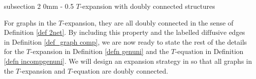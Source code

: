 \documentclass{article}
\makeatletter
\newcommand{\1}{\mathds{1}}
\numberwithin{equation}{section}
\newcommand{\dashed}{\text{diffusive}}
\newcommand{\selfs}{\text{self-energies}}
\theoremstyle{plain} %
\theoremstyle{remark}
\newtheorem{remark}[theorem]{Remark}
\newcommand{\incomp}{{\text{$T$-equation}}}
\renewcommand{\subsection}{\@startsection
{subsection}%
{2}%
{0mm}%
{-\baselineskip}%
{0.5\baselineskip}%
{\normalfont\bf\itshape}} %
\makeatother
\begin{document}


 

 
 \subsection{$T$-expansion with doubly connected structures}
 
For graphs in the $T$-expansion, they are all doubly connected in the sense of Definition \ref{def 2net}. By including this property and the labelled $\dashed$ edges in Definition \ref{def_graph comp}, we are now ready to state the rest of the details for the $T$-expansion in Definition \ref{defn genuni} and the $\incomp$ in Definition \ref{defn incompgenuni}. We will design an expansion strategy in \cite{PartII_high} so that all graphs in the $T$-expansion and $\incomp$ are doubly connected.
 
\end{document}
